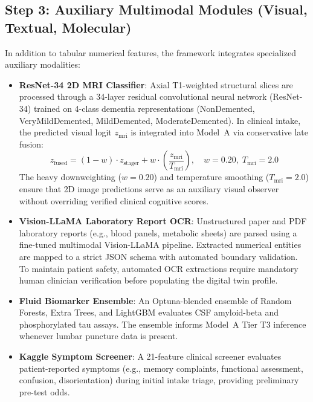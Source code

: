 \documentclass[11pt,a4paper]{article}
\begin{document}
\subsection{Step 3: Auxiliary Multimodal Modules (Visual, Textual, Molecular)}
\label{sec:method_multimodal}
In addition to tabular numerical features, the framework integrates specialized auxiliary modalities:
\begin{itemize}
    \item \textbf{ResNet-34 2D MRI Classifier}: Axial T1-weighted structural slices are processed through a 34-layer residual convolutional neural network (ResNet-34) trained on 4-class dementia representations (NonDemented, VeryMildDemented, MildDemented, ModerateDemented). In clinical intake, the predicted visual logit $z_{\text{mri}}$ is integrated into Model~A via conservative late fusion:
    \begin{equation}
        z_{\text{fused}} = (1 - w) \cdot z_{\text{stager}} + w \cdot \left(\frac{z_{\text{mri}}}{T_{\text{mri}}}\right), \quad w = 0.20, \; T_{\text{mri}} = 2.0
        \label{eq:mri_fusion}
    \end{equation}
    The heavy downweighting ($w = 0.20$) and temperature smoothing ($T_{\text{mri}} = 2.0$) ensure that 2D image predictions serve as an auxiliary visual observer without overriding verified clinical cognitive scores.
    \item \textbf{Vision-LLaMA Laboratory Report OCR}: Unstructured paper and PDF laboratory reports (e.g., blood panels, metabolic sheets) are parsed using a fine-tuned multimodal Vision-LLaMA pipeline. Extracted numerical entities are mapped to a strict JSON schema with automated boundary validation. To maintain patient safety, automated OCR extractions require mandatory human clinician verification before populating the digital twin profile.
    \item \textbf{Fluid Biomarker Ensemble}: An Optuna-blended ensemble of Random Forests, Extra Trees, and LightGBM evaluates CSF amyloid-beta and phosphorylated tau assays. The ensemble informs Model~A Tier T3 inference whenever lumbar puncture data is present.
    \item \textbf{Kaggle Symptom Screener}: A 21-feature clinical screener evaluates patient-reported symptoms (e.g., memory complaints, functional assessment, confusion, disorientation) during initial intake triage, providing preliminary pre-test odds.
\end{itemize}
\end{document}
